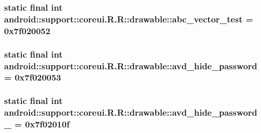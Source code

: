 \hypertarget{classandroid_1_1support_1_1coreui_1_1_r_1_1drawable_c8e2bbf1612ed63401bccf323a0294b5}{
\subsubsection[{abc\_\-vector\_\-test}]{\setlength{\rightskip}{0pt plus 5cm}static final int android::support::coreui.R.R::drawable::abc\_\-vector\_\-test = 0x7f020052}}
\label{classandroid_1_1support_1_1coreui_1_1_r_1_1drawable_c8e2bbf1612ed63401bccf323a0294b5}


\hypertarget{classandroid_1_1support_1_1coreui_1_1_r_1_1drawable_9fb6c1a20a629433b6513a02b95f312e}{
\subsubsection[{avd\_\-hide\_\-password}]{\setlength{\rightskip}{0pt plus 5cm}static final int android::support::coreui.R.R::drawable::avd\_\-hide\_\-password = 0x7f020053}}
\label{classandroid_1_1support_1_1coreui_1_1_r_1_1drawable_9fb6c1a20a629433b6513a02b95f312e}


\hypertarget{classandroid_1_1support_1_1coreui_1_1_r_1_1drawable_f0606b31e05051dec43edcc97dd4a7b3}{
\subsubsection[{avd\_\-hide\_\-password\_\-1}]{\setlength{\rightskip}{0pt plus 5cm}static final int android::support::coreui.R.R::drawable::avd\_\-hide\_\-password\_ = 0x7f02010f}}
\label{classandroid_1_1support_1_1coreui_1_1_r_1_1drawable_f0606b31e05051dec43edcc97dd4a7b3}


